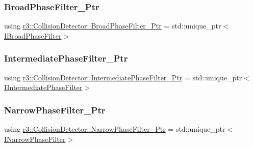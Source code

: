 \subsubsection{\texorpdfstring{Broad\+Phase\+Filter\+\_\+\+Ptr}{BroadPhaseFilter\_Ptr}}
{\footnotesize\ttfamily using \mbox{\hyperlink{classr3_1_1_collision_detector_aa8ed51d53c6f6ce545c93ad0e356d6de}{r3\+::\+Collision\+Detector\+::\+Broad\+Phase\+Filter\+\_\+\+Ptr}} =  std\+::unique\+\_\+ptr$<$\mbox{\hyperlink{classr3_1_1_i_broad_phase_filter}{I\+Broad\+Phase\+Filter}}$>$}

\mbox{\label{classr3_1_1_collision_detector_a8337c2c23ec77350b65977e043c07827}} 
\subsubsection{\texorpdfstring{Intermediate\+Phase\+Filter\+\_\+\+Ptr}{IntermediatePhaseFilter\_Ptr}}
{\footnotesize\ttfamily using \mbox{\hyperlink{classr3_1_1_collision_detector_a8337c2c23ec77350b65977e043c07827}{r3\+::\+Collision\+Detector\+::\+Intermediate\+Phase\+Filter\+\_\+\+Ptr}} =  std\+::unique\+\_\+ptr$<$\mbox{\hyperlink{classr3_1_1_i_intermediate_phase_filter}{I\+Intermediate\+Phase\+Filter}}$>$}

\mbox{\label{classr3_1_1_collision_detector_a094cc287cba14d5a063cfca41e667008}} 
\subsubsection{\texorpdfstring{Narrow\+Phase\+Filter\+\_\+\+Ptr}{NarrowPhaseFilter\_Ptr}}
{\footnotesize\ttfamily using \mbox{\hyperlink{classr3_1_1_collision_detector_a094cc287cba14d5a063cfca41e667008}{r3\+::\+Collision\+Detector\+::\+Narrow\+Phase\+Filter\+\_\+\+Ptr}} =  std\+::unique\+\_\+ptr$<$\mbox{\hyperlink{classr3_1_1_i_narrow_phase_filter}{I\+Narrow\+Phase\+Filter}}$>$}



